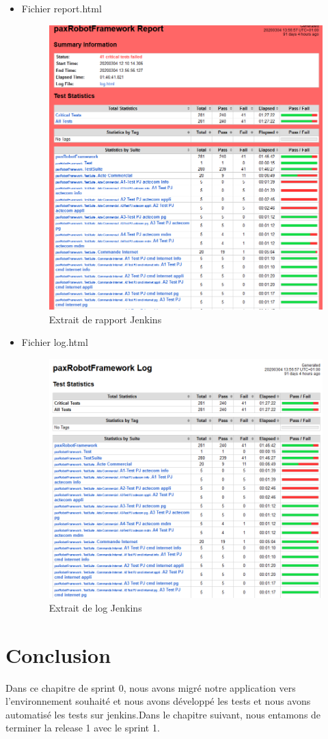 \begin{itemize}
	\item Fichier report.html
	\begin{figure}[H]
		\centering
		\includegraphics[width=0.55\linewidth]{"img/jenkins/exemple report"}
		\caption[Extrait de rapport Jenkins]{Extrait de rapport Jenkins}
		\label{fig:exemple-report}
	\end{figure}
	\item Fichier log.html
	\begin{figure}[H]
		\centering
		\includegraphics[width=0.55\linewidth]{"img/jenkins/exemple log"}
		\caption[Extrait de log Jenkins]{Extrait de log Jenkins}
		\label{fig:exemple-log}
	\end{figure}
\end{itemize}

\section*{Conclusion}
Dans ce chapitre de sprint 0, nous avons migré notre application vers l’environnement souhaité et nous avons développé les tests et nous avons automatisé les tests sur jenkins.Dans le chapitre suivant, nous entamons de terminer la release 1 avec le sprint 1.



